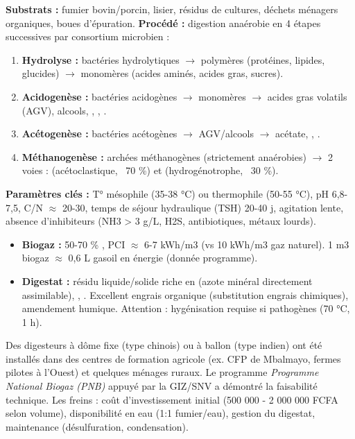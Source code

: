 \documentclass[11pt]{article}
\newcommand{\cle}[1]{{\popxbold\color{popdark}#1}}
\begin{document}
\begin{experience}
\textbf{Substrats :} fumier bovin/porcin, lisier, résidus de cultures, déchets ménagers organiques, boues d'épuration.
\textbf{Procédé :} digestion anaérobie en 4 étapes successives par consortium microbien :
\begin{enumerate}
\item \textbf{Hydrolyse :} bactéries hydrolytiques $\rightarrow$ polymères (protéines, lipides, glucides) $\rightarrow$ monomères (acides aminés, acides gras, sucres).
\item \textbf{Acidogenèse :} bactéries acidogènes $\rightarrow$ monomères $\rightarrow$ acides gras volatils (AGV), alcools, , , .
\item \textbf{Acétogenèse :} bactéries acétogènes $\rightarrow$ AGV/alcools $\rightarrow$ acétate, , .
\item \textbf{Méthanogenèse :} archées méthanogènes (strictement anaérobies) $\rightarrow$ 2 voies :  (acétoclastique, ~70 \%) et  (hydrogénotrophe, ~30 \%).
\end{enumerate}
\textbf{Paramètres clés :} T° mésophile (35-38 °C) ou thermophile (50-55 °C), pH 6,8-7,5, C/N $\approx$ 20-30, temps de séjour hydraulique (TSH) 20-40 j, agitation lente, absence d'inhibiteurs (NH3 > 3 g/L, H2S, antibiotiques, métaux lourds).
\end{experience}

\begin{propriete}
\begin{itemize}
\item \textbf{Biogaz :} 50-70 \% , PCI $\approx$ 6-7 kWh/m3 (vs 10 kWh/m3 gaz naturel). 1 m3 biogaz $\approx$ 0,6 L gasoil en énergie (donnée programme).
\item \textbf{Digestat :} résidu liquide/solide riche en  (azote minéral directement assimilable), , . Excellent \cle{engrais organique} (substitution engrais chimiques), amendement humique. Attention : hygénisation requise si pathogènes (70 °C, 1 h).
\end{itemize}
\end{propriete}

\begin{savaistu}
Des digesteurs à dôme fixe (type chinois) ou à ballon (type indien) ont été installés dans des centres de formation agricole (ex. CFP de Mbalmayo, fermes pilotes à l'Ouest) et quelques ménages ruraux. Le programme \emph{Programme National Biogaz (PNB)} appuyé par la GIZ/SNV a démontré la faisabilité technique. Les freins : coût d'investissement initial (500 000 - 2 000 000 FCFA selon volume), disponibilité en eau (1:1 fumier/eau), gestion du digestat, maintenance (désulfuration, condensation).
\end{savaistu}
\end{document}
